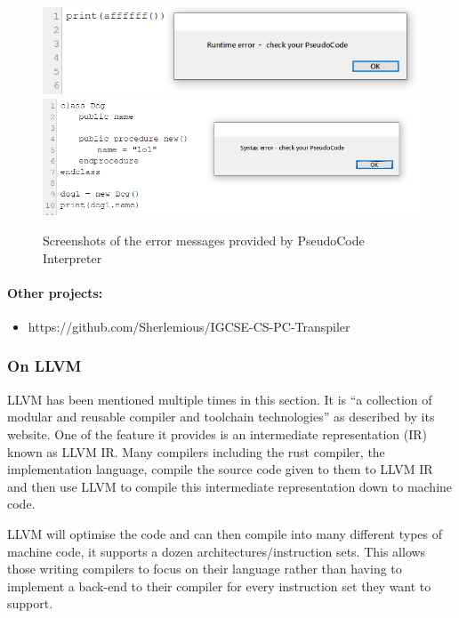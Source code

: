 \documentclass{article}
\begin{document}
\begin{figure}
	\includegraphics[width=\textwidth]{pseudocodeuk_runtime_err}
	\includegraphics[width=\textwidth]{pseudocodeuk_syntax_err}
	\caption{Screenshots of the error messages provided by PseudoCode
	Interpreter}
	\label{fig:pseudocodeuk_errors}
\end{figure}

\paragraph{Other projects:}

\begin{itemize}
    \item{https://github.com/Sherlemious/IGCSE-CS-PC-Transpiler}
\end{itemize}

\subsubsection{On LLVM}

LLVM has been mentioned multiple times in this section. It is ``a collection of
modular and reusable compiler and toolchain technologies'' as described by its
website. One of the feature it provides is an intermediate representation (IR)
known as LLVM IR. Many compilers including the rust compiler, the
implementation language, compile the source code given to them to LLVM IR and
then use LLVM to compile this intermediate representation down to machine code.

LLVM will optimise the code and can then compile into many different types of
machine code, it supports a dozen architectures/instruction sets. This allows
those writing compilers to focus on their language rather than having to
implement a back-end to their compiler for every instruction set they want to
support.
\end{document}
